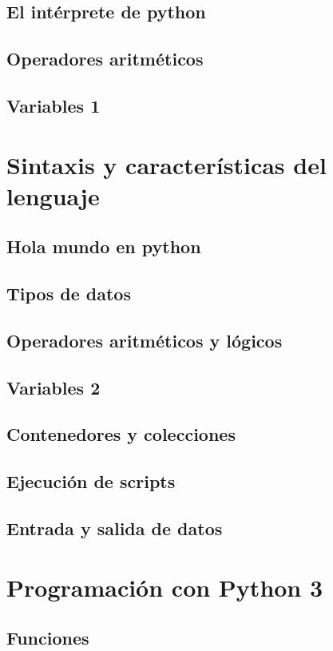 \documentclass[10pt]{beamer}
\begin{document}
\subsection{El intérprete de python}

\subsection{Operadores aritméticos}
\subsection{Variables 1}

\section{Sintaxis y características del lenguaje}
\subsection{Hola mundo en python}
\subsection{Tipos de datos}
\subsection{Operadores aritméticos y lógicos}
\subsection{Variables 2}
\subsection{Contenedores y colecciones}
\subsection{Ejecución de scripts}
\subsection{Entrada y salida de datos}


\section{Programación con Python 3}
\subsection{Funciones}
\end{document}
